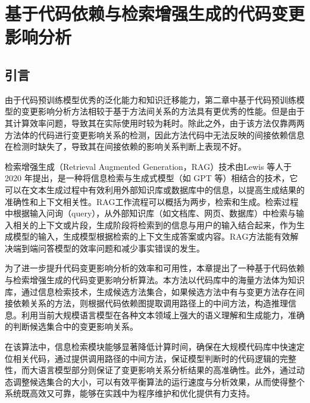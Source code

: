 \chapter{基于代码依赖与检索增强生成的代码变更影响分析}

\section{引言}


由于代码预训练模型优秀的泛化能力和知识迁移能力，第二章中基于代码预训练模型的变更影响分析方法相较于基于方法间关系的方法具有更优秀的性能。但是由于其计算效率问题，导致其在实际使用时较为耗时。除此之外，由于该方法仅靠两两方法体的代码进行变更影响关系的检测，因此方法代码中无法反映的间接依赖信息在检测时缺失了，导致其在间接依赖的影响关系判断上表现不好。

检索增强生成（Retrieval Augmented Generation，RAG）技术由Lewis 等人\cite{2020Retrieval}于 2020 年提出，是一种将信息检索与生成式模型（如 GPT 等）相结合的技术，它可以在文本生成过程中有效利用外部知识库或数据库中的信息，以提高生成结果的准确性和上下文相关性。RAG工作流程可以概括为两步，检索和生成。检索过程中根据输入问询（query），从外部知识库（如文档库、网页、数据库）中检索与输入相关的上下文或片段，生成阶段将检索到的信息与用户的输入结合起来，作为生成模型的输入，生成模型根据检索的上下文生成答案或内容。RAG方法能有效解决端到端问答模型的效率问题和减少事实错误的发生。

为了进一步提升代码变更影响分析的效率和可用性，本章提出了一种基于代码依赖与检索增强生成的代码变更影响分析算法。本方法以代码库中的海量方法体为知识库，通过信息检索技术，生成候选方法集合，如果候选方法中有与变更方法存在间接依赖关系的方法，则根据代码依赖图提取调用路径上的中间方法，构造推理信息。利用当前大规模语言模型在各种文本领域上强大的语义理解和生成能力，准确的判断候选集合中的变更影响关系。

在该算法中，信息检索模块能够显著降低计算时间，确保在大规模代码库中快速定位相关代码，通过提供调用路径的中间方法，保证模型判断时的代码逻辑的完整性，而大语言模型部分则保证了变更影响关系分析结果的高准确性。此外，通过动态调整候选集合的大小，可以有效平衡算法的运行速度与分析效果，从而使得整个系统既高效又可靠，能够在实践中为程序维护和优化提供有力支持。

